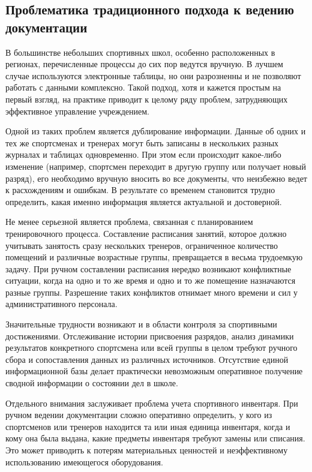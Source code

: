 \subsection{Проблематика традиционного подхода к ведению документации}

В большинстве небольших спортивных школ, особенно расположенных в регионах, перечисленные процессы до сих пор ведутся вручную. В лучшем случае используются электронные таблицы, но они разрозненны и не позволяют работать с данными комплексно. Такой подход, хотя и кажется простым на первый взгляд, на практике приводит к целому ряду проблем, затрудняющих эффективное управление учреждением.

Одной из таких проблем является дублирование информации. Данные об одних и тех же спортсменах и тренерах могут быть записаны в нескольких разных журналах и таблицах одновременно. При этом если происходит какое-либо изменение (например, спортсмен переходит в другую группу или получает новый разряд), его необходимо вручную вносить во все документы, что неизбежно ведет к расхождениям и ошибкам. В результате со временем становится трудно определить, какая именно информация является актуальной и достоверной.

Не менее серьезной является проблема, связанная с планированием тренировочного процесса. Составление расписания занятий, которое должно учитывать занятость сразу нескольких тренеров, ограниченное количество помещений и различные возрастные группы, превращается в весьма трудоемкую задачу. При ручном составлении расписания нередко возникают конфликтные ситуации, когда на одно и то же время и одно и то же помещение назначаются разные группы. Разрешение таких конфликтов отнимает много времени и сил у административного персонала.

Значительные трудности возникают и в области контроля за спортивными достижениями. Отслеживание истории присвоения разрядов, анализ динамики результатов конкретного спортсмена или всей группы в целом требуют ручного сбора и сопоставления данных из различных источников. Отсутствие единой информационной базы делает практически невозможным оперативное получение сводной информации о состоянии дел в школе.

Отдельного внимания заслуживает проблема учета спортивного инвентаря. При ручном ведении документации сложно оперативно определить, у кого из спортсменов или тренеров находится та или иная единица инвентаря, когда и кому она была выдана, какие предметы инвентаря требуют замены или списания. Это может приводить к потерям материальных ценностей и неэффективному использованию имеющегося оборудования.

